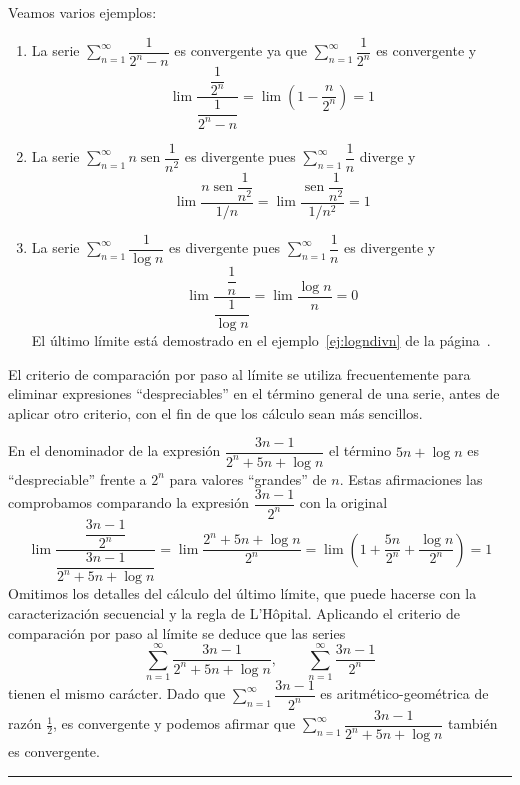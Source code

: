 \begin{ejemplo}\label{ej:comparacion} Veamos varios ejemplos:
\begin{enumerate}
\item La serie $\displaystyle\sum_{n=1}^\infty  \dfrac{1}{2^n-n}$ es convergente ya que $\displaystyle\sum_{n=1}^\infty  \dfrac{1}{2^n}$ es convergente y
\[
\lim \dfrac{\dfrac{1}{2^n}}{\dfrac{1}{2^n-n}}=\lim \left(1-\dfrac{n}{2^n}\right)=1
\]
\item La serie $\displaystyle\sum_{n=1}^\infty  n\operatorname{sen}\dfrac{1}{n^2}$ es divergente pues $\displaystyle\sum_{n=1}^\infty  \dfrac{1}{n}$ diverge y  
\[
\lim \dfrac{n\operatorname{sen}\dfrac{1}{n^2}}{1/n}=\lim\dfrac{\operatorname{sen}\dfrac{1}{n^2}}{1/n^2}=1
\]
\item
\label{ej:logn}
La serie $\displaystyle\sum_{n=1}^\infty  \dfrac{1}{\log n}$ es divergente pues $\displaystyle\sum_{n=1}^\infty  \dfrac{1}{n}$ es divergente y
\[
\lim \dfrac{\dfrac{1}{n}}{\dfrac{1}{\log n}}=\lim \dfrac{\log n}{n} = 0
\]
El último límite está demostrado en el ejemplo~\ref{ej:logndivn} de la página~\pageref{ej:logndivn}.\fej
\end{enumerate}
\end{ejemplo}


El criterio de comparación por paso al límite se utiliza frecuentemente para eliminar expresiones ``despreciables'' en el término general de una serie, antes de aplicar otro criterio, con el fin de que los cálculo sean más sencillos. 

\begin{ejemplo}
En el denominador de la expresión $\dfrac{3n-1}{2^n+5n+\log n}$ el término $5n+\log n$ es ``despreciable'' frente a $2^n$ para valores ``grandes'' de $n$.
Estas afirmaciones las comprobamos comparando la expresión $\dfrac{3n-1}{2^n}$ con la original
\[
\lim \dfrac{\dfrac{3n-1}{2^n}}{\dfrac{3n-1}{2^n+5n+\log n}}=
\lim \dfrac{2^n+5n+\log n}{2^n} =
\lim \left(1+\dfrac{5n}{2^n}+\dfrac{\log n}{2^n}\right) = 1
\]
Omitimos los detalles del cálculo del último límite, que puede hacerse con la caracterización secuencial y la regla de L'Hôpital.
Aplicando el criterio de comparación por paso al límite se deduce que las series
\[
\displaystyle\sum_{n=1}^\infty  \dfrac{3n-1}{2^n+5n+\log n},\qquad \displaystyle\sum_{n=1}^\infty  \dfrac{3n-1}{2^n}
\]
tienen el mismo carácter.
Dado que $\displaystyle\sum_{n=1}^\infty  \dfrac{3n-1}{2^n}$ es aritmético-geométrica de razón $\frac12$, es convergente y podemos afirmar que $\displaystyle\sum_{n=1}^\infty  \dfrac{3n-1}{2^n+5n+\log n}$ también es convergente.\newline
\rule{10pt}{0pt}\hfill\fej\end{ejemplo}

